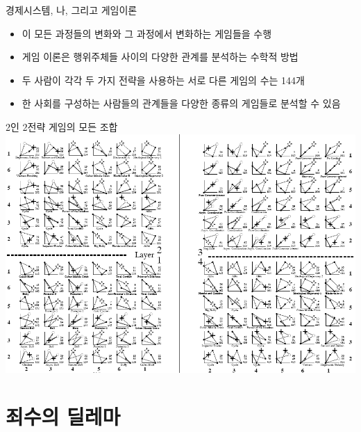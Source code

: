 \documentclass[final]{beamer}
\begin{document}

\begin{frame}[t]{경제시스템, 나, 그리고 게임이론}
	\begin{itemize}
		\item 이 모든 과정들의 변화와 그 과정에서 변화하는 게임들을 수행
		\item 게임 이론은 행위주체들 사이의 다양한 관계를 분석하는 수학적 방법 
		\item 두 사람이 각각 두 가지 전략을 사용하는 서로 다른 게임의 수는 144개
		\item 한 사회를 구성하는 사람들의 관계들을 다양한 종류의 게임들로 분석할 수 있음
	\end{itemize}
\end{frame}

\begin{frame}[t]{2인 2전략 게임의 모든 조합}
	\includegraphics[width=\textwidth]{periodicgametable.png}
\end{frame}


\section{죄수의 딜레마} %
\label{sec:PDGame}
\end{document}
